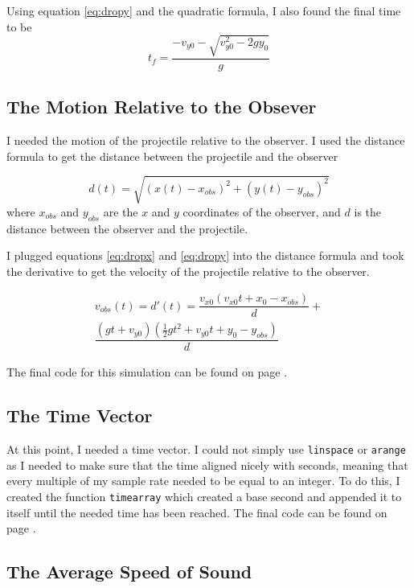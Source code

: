 \documentclass[%
 reprint,
 amsmath,amssymb,
 aps,
]{revtex4-1}
\begin{document}
Using equation \ref{eq:dropy} and the quadratic formula, I also found the final time to be
\begin{equation}\label{eq:droptf}
t_f = \dfrac{-v_{y0} - \sqrt{v_{y0}^2 - 2 g y_0} }{g}
\end{equation}


\subsection{\label{sec:motion}The Motion Relative to the Obsever}

I needed the motion of the projectile relative to the observer. I used the distance formula to get the distance between the projectile and the observer

\begin{equation}\label{eq:dropd}
d(t) = \sqrt{(x(t)-x_{obs})^2 + (y(t)-y_{obs})^2}
\end{equation}
where $x_{obs}$ and $y_{obs}$ are the $x$ and $y$ coordinates of the observer, and $d$ is the distance between the observer and the projectile.

I plugged equations \ref{eq:dropx} and \ref{eq:dropy} into the distance formula and took the derivative to get the velocity of the projectile relative to the observer.

\begin{multline}\label{eq:dropvobs}
v_{obs}(t) = d'(t) = 
\dfrac{v_{x0}(v_{x0}t+x_0-x_{obs})}{d}+\\
\dfrac{(gt+v_{y0})(\frac{1}{2}gt^2+v_{y0}t+y_0-y_{obs})}{d}
\end{multline}

The final code for this simulation can be found on page \pageref{sec:codesim}.

\subsection{\label{sec:timevec}The Time Vector}

At this point, I needed a time vector. I could not simply use \verb|linspace| or \verb|arange| as I needed to make sure that the time aligned nicely with seconds, meaning that every multiple of my sample rate needed to be equal to an integer. To do this, I created the function \verb|timearray| which created a base second and appended it to itself until the needed time has been reached. The final code can be found on page \pageref{sec:codetimearr}.

\subsection{\label{sec:soundspeed}The Average Speed of Sound}
\end{document}
